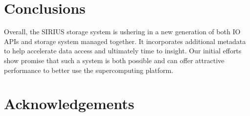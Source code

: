 \documentclass{sig-alt-gov2}
\begin{document}
\section{Conclusions}
\label{sec:conclusion}

Overall, the SIRIUS storage system is ushering in a new generation of both IO
APIs and storage system managed together. It incorporates additional metadata
to help accelerate data access and ultimately time to insight. Our initial
efforts show promise that such a system is both possible and can offer
attractive performance to better use the supercomputing platform.

\section{Acknowledgements}
\end{document}
